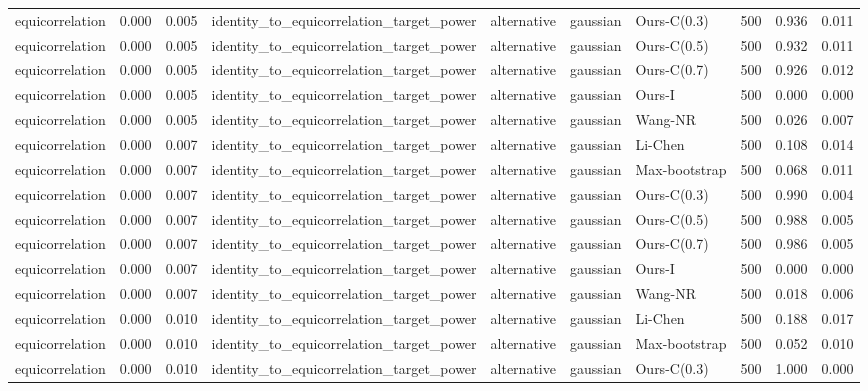 \begin{tabular}{lrrllllrrr}
equicorrelation & 0.000 & 0.005 & identity\_to\_equicorrelation\_target\_power & alternative & gaussian & Ours-C(0.3) & 500 & 0.936 & 0.011 \\
equicorrelation & 0.000 & 0.005 & identity\_to\_equicorrelation\_target\_power & alternative & gaussian & Ours-C(0.5) & 500 & 0.932 & 0.011 \\
equicorrelation & 0.000 & 0.005 & identity\_to\_equicorrelation\_target\_power & alternative & gaussian & Ours-C(0.7) & 500 & 0.926 & 0.012 \\
equicorrelation & 0.000 & 0.005 & identity\_to\_equicorrelation\_target\_power & alternative & gaussian & Ours-I & 500 & 0.000 & 0.000 \\
equicorrelation & 0.000 & 0.005 & identity\_to\_equicorrelation\_target\_power & alternative & gaussian & Wang-NR & 500 & 0.026 & 0.007 \\
equicorrelation & 0.000 & 0.007 & identity\_to\_equicorrelation\_target\_power & alternative & gaussian & Li-Chen & 500 & 0.108 & 0.014 \\
equicorrelation & 0.000 & 0.007 & identity\_to\_equicorrelation\_target\_power & alternative & gaussian & Max-bootstrap & 500 & 0.068 & 0.011 \\
equicorrelation & 0.000 & 0.007 & identity\_to\_equicorrelation\_target\_power & alternative & gaussian & Ours-C(0.3) & 500 & 0.990 & 0.004 \\
equicorrelation & 0.000 & 0.007 & identity\_to\_equicorrelation\_target\_power & alternative & gaussian & Ours-C(0.5) & 500 & 0.988 & 0.005 \\
equicorrelation & 0.000 & 0.007 & identity\_to\_equicorrelation\_target\_power & alternative & gaussian & Ours-C(0.7) & 500 & 0.986 & 0.005 \\
equicorrelation & 0.000 & 0.007 & identity\_to\_equicorrelation\_target\_power & alternative & gaussian & Ours-I & 500 & 0.000 & 0.000 \\
equicorrelation & 0.000 & 0.007 & identity\_to\_equicorrelation\_target\_power & alternative & gaussian & Wang-NR & 500 & 0.018 & 0.006 \\
equicorrelation & 0.000 & 0.010 & identity\_to\_equicorrelation\_target\_power & alternative & gaussian & Li-Chen & 500 & 0.188 & 0.017 \\
equicorrelation & 0.000 & 0.010 & identity\_to\_equicorrelation\_target\_power & alternative & gaussian & Max-bootstrap & 500 & 0.052 & 0.010 \\
equicorrelation & 0.000 & 0.010 & identity\_to\_equicorrelation\_target\_power & alternative & gaussian & Ours-C(0.3) & 500 & 1.000 & 0.000 \\

\end{tabular}
